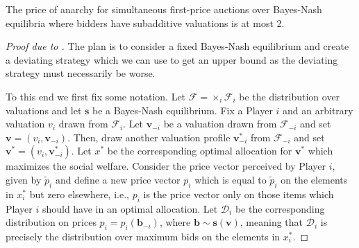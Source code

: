 \begin{theorem}
  The price of anarchy for simultaneous first-price auctions over Bayes-Nash equilibria where bidders have subadditive valuations is at most 2.
\end{theorem}
\begin{proof}[Proof due to \cite{10.1145/2488608.2488634}]
  The plan is to consider a fixed Bayes-Nash equilibrium and create a deviating strategy which we can use to get an upper bound as the deviating strategy must necessarily be worse.

  To this end we first fix some notation. Let $ \mathcal{F} = \times_i \mathcal{F}_i $ be the distribution over valuations and let $ \mathbf{s} $ be a Bayes-Nash equilibrium. Fix a Player $ i $ and an arbitrary valuation $ v_i $ drawn from $ \mathcal{F}_i $. Let $ \mathbf{v}_{-i} $ be a valuation drawn from $ \mathcal{F}_{-i} $ and set $ \mathbf{v} = (v_i, \mathbf{v}_{-i}) $. Then, draw another valuation profile $ \mathbf{v}_{-i}^{*} $ from $ \mathcal{F}_{-i} $ and set $ \mathbf{v}^{*} = (v_i, \mathbf{v}_{-i}^{*}) $. Let $ x^{*} $ be the corresponding optimal allocation for $ \mathbf{v}^{*} $ which maximizes the social welfare. Consider the price vector perceived by Player $ i $, given by $ \tilde{p}_i $ and define a new price vector $ p_i $ which is equal to $ \tilde{p}_i $ on the elements in $ x^{*}_i $ but zero elsewhere, i.e., $ p_i $ is the price vector only on those items which Player $ i $ should have in an optimal allocation. Let $ \mathcal{D}_i $ be the corresponding distribution on prices $ p_i=p_i(\mathbf{b}_{-i}) $, where $ \mathbf{b} \sim \mathbf{s}(\mathbf{v}) $, meaning that $ \mathcal{D}_i $ is precisely the distribution over maximum bids on the elements in $ x_i^{*} $.


\end{proof}
